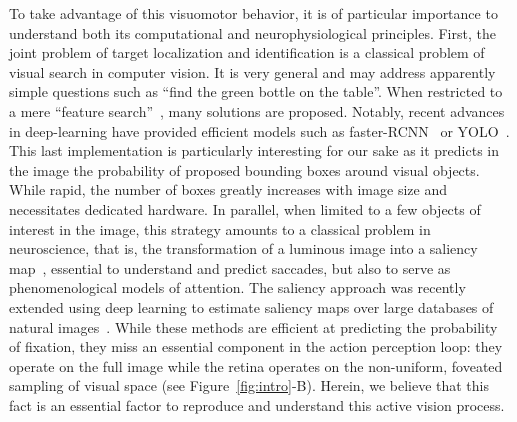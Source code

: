 To take advantage of this visuomotor behavior, it is of particular importance to understand both its computational and neurophysiological principles. First, the joint problem of target localization and identification is a classical problem of visual search in computer vision. It is very general and may address apparently simple questions such as ``find the green bottle on the table''. 
When restricted to a mere ``feature search''~\citep{Treisman80}, many solutions are proposed. Notably, recent advances in deep-learning have provided efficient models such as faster-RCNN~\citep{Ren17} or YOLO~\citep{Redmon15}. 
This last implementation is particularly interesting for our sake as it predicts in the image the probability of proposed bounding boxes around visual objects. While rapid, the number of boxes greatly increases with image size and necessitates dedicated hardware. 
In parallel, when limited to a few objects of interest in the image, this strategy amounts to a classical problem in neuroscience, that is, the transformation of a luminous image into a saliency map~\citep{Itti01}, essential to understand and predict saccades, but also to serve as phenomenological models of attention. The saliency approach was recently extended using deep learning to estimate saliency maps over large databases of natural images~\citep{Kummerer16}. While these methods are efficient at predicting the probability of fixation, they miss an essential component in the action perception loop: they operate on the full image while the retina operates on the non-uniform, foveated sampling of visual space (see Figure~\ref{fig:intro}-B). 
Herein, we believe that this fact is an essential factor to reproduce and understand this active vision process.

